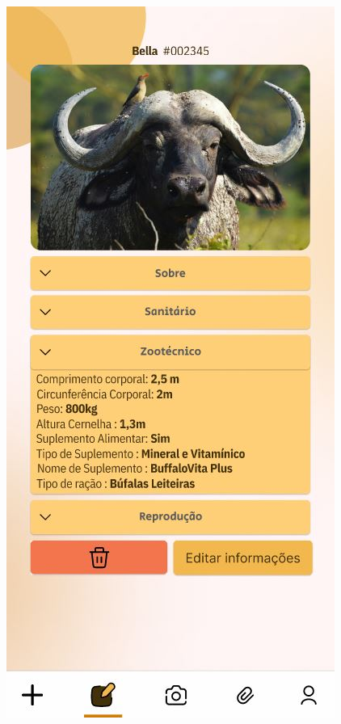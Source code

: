 \begin{figure}[!h]
\includegraphics[scale=0.4]{Illustrations/UX-Mobile/Mobi-03.03.JPG}

\end{figure}
